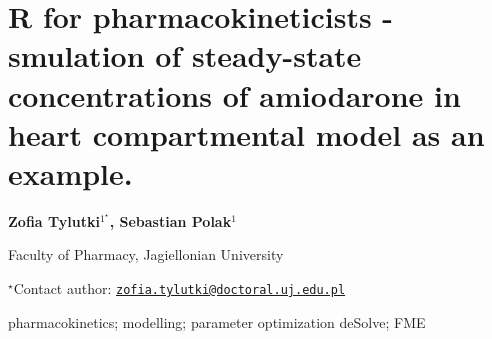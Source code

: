 \documentclass[\main/boa.tex]{subfiles}
\begin{document}
\section{R for pharmacokineticists - smulation of steady-state concentrations of
amiodarone in heart compartmental model as an example.}

\begin{center}
  {\bf Zofia Tylutki$^{1^\star}$, Sebastian Polak$^{1}$}
\end{center}

\vskip 0.3cm

\begin{affiliations}
\begin{enumerate}
\begin{minipage}{0.915\textwidth}
\centering
\item Faculty of Pharmacy, Jagiellonian University \\[-2pt]
\end{minipage}
\end{enumerate}
$^\star$Contact author: \href{mailto:zofia.tylutki@doctoral.uj.edu.pl}{\nolinkurl{zofia.tylutki@doctoral.uj.edu.pl}}\\
\end{affiliations}

\vskip 0.5cm

\begin{minipage}{0.915\textwidth}
\keywords pharmacokinetics; modelling; parameter optimization
\packages deSolve; FME
\end{minipage}

\vskip 0.8cm
\end{document}
